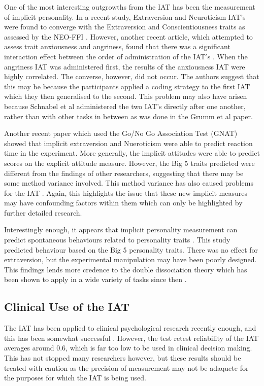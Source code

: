 One of the most interesting outgrowths from the IAT has been the measurement of implicit personality. In a recent study, Extraversion and Neuroticism IAT's were found to converge with the Extraversion and Conscientiousness traits as assessed by the NEO-FFI \cite{Grumm2007}. However, another recent article, which attempted to assess trait anxiousness and angriness, found that there was a significant interaction effect between the order of administration of the IAT's \cite{Schnabel2006}. When the angriness IAT was administered first, the results of the anxiousness IAT were highly correlated. The converse, however, did not occur. The authors suggest that this may be because the participants applied a coding strategy to the first IAT which they then generalised to the second. This problem may also have arisen because Schnabel et al administered the two IAT's directly after one another, rather than with other tasks in between as was done in the Grumm et al paper. 

Another recent paper \cite{Boldero2007} which used the Go/No Go Association Test (GNAT) showed that implicit extraversion and Nueroticism were able to predict reaction time in the experiment. More generally, the implicit attitudes were able to predict scores on the explicit attitude measure. However, the Big 5 traits predicted were different from the findings of other researchers, suggesting that there may be some method variance involved. This method variance has also caused problems for the IAT \cite{Mierke2003,Greenwald2003a} . Again, this highlights the issue that these new implicit measures may have confounding factors within them which can only be highlighted by further detailed research.

Interestingly enough, it appears that implicit personality measurement can predict spontaneous behaviours related to  personality traits \cite{Steffens2006}. This study predicted behaviour based on the Big 5 personality traits. There was no effect for extraversion, but the experimental manipulation may have been poorly designed. This findings lends more credence to the double dissociation theory \cite{Asendorpf2002} which has been shown to apply in a wide variety of tasks since then \cite{Perugini2005}. 

\subsection{Clinical Use of the IAT}

The IAT has been applied to clinical psychological research recently enough, and this has been somewhat successful \cite{DeHouwer2002}. However, the test retest reliability of the IAT averages around 0.6, which is far too low to be used in clinical decision making. This has not stopped many researchers however, but these results should be treated with caution as the precision of measurement may not be adaquete for the purposes for which the IAT is being used. 

